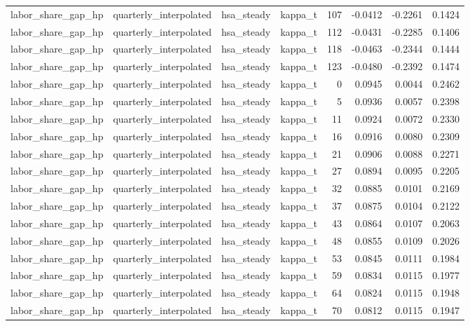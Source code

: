 \begin{tabular}{llllrrrr}
labor\_share\_gap\_hp & quarterly\_interpolated & hsa\_steady & kappa\_t & 107 & -0.0412 & -0.2261 & 0.1424 \\
labor\_share\_gap\_hp & quarterly\_interpolated & hsa\_steady & kappa\_t & 112 & -0.0431 & -0.2285 & 0.1406 \\
labor\_share\_gap\_hp & quarterly\_interpolated & hsa\_steady & kappa\_t & 118 & -0.0463 & -0.2344 & 0.1444 \\
labor\_share\_gap\_hp & quarterly\_interpolated & hsa\_steady & kappa\_t & 123 & -0.0480 & -0.2392 & 0.1474 \\
labor\_share\_gap\_hp & quarterly\_interpolated & hsa\_steady & kappa\_t & 0 & 0.0945 & 0.0044 & 0.2462 \\
labor\_share\_gap\_hp & quarterly\_interpolated & hsa\_steady & kappa\_t & 5 & 0.0936 & 0.0057 & 0.2398 \\
labor\_share\_gap\_hp & quarterly\_interpolated & hsa\_steady & kappa\_t & 11 & 0.0924 & 0.0072 & 0.2330 \\
labor\_share\_gap\_hp & quarterly\_interpolated & hsa\_steady & kappa\_t & 16 & 0.0916 & 0.0080 & 0.2309 \\
labor\_share\_gap\_hp & quarterly\_interpolated & hsa\_steady & kappa\_t & 21 & 0.0906 & 0.0088 & 0.2271 \\
labor\_share\_gap\_hp & quarterly\_interpolated & hsa\_steady & kappa\_t & 27 & 0.0894 & 0.0095 & 0.2205 \\
labor\_share\_gap\_hp & quarterly\_interpolated & hsa\_steady & kappa\_t & 32 & 0.0885 & 0.0101 & 0.2169 \\
labor\_share\_gap\_hp & quarterly\_interpolated & hsa\_steady & kappa\_t & 37 & 0.0875 & 0.0104 & 0.2122 \\
labor\_share\_gap\_hp & quarterly\_interpolated & hsa\_steady & kappa\_t & 43 & 0.0864 & 0.0107 & 0.2063 \\
labor\_share\_gap\_hp & quarterly\_interpolated & hsa\_steady & kappa\_t & 48 & 0.0855 & 0.0109 & 0.2026 \\
labor\_share\_gap\_hp & quarterly\_interpolated & hsa\_steady & kappa\_t & 53 & 0.0845 & 0.0111 & 0.1984 \\
labor\_share\_gap\_hp & quarterly\_interpolated & hsa\_steady & kappa\_t & 59 & 0.0834 & 0.0115 & 0.1977 \\
labor\_share\_gap\_hp & quarterly\_interpolated & hsa\_steady & kappa\_t & 64 & 0.0824 & 0.0115 & 0.1948 \\
labor\_share\_gap\_hp & quarterly\_interpolated & hsa\_steady & kappa\_t & 70 & 0.0812 & 0.0115 & 0.1947 \\

\end{tabular}
